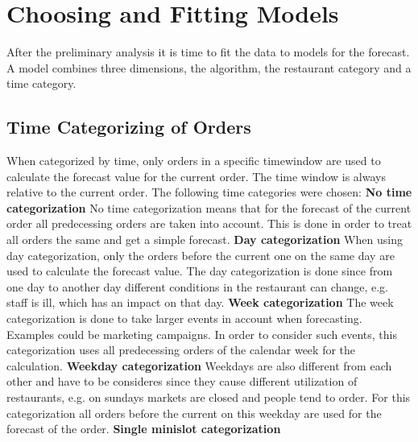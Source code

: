 \section{Choosing and Fitting Models}\label{Choosing and Fitting Models}
After the preliminary analysis it is time to fit the data to models for the forecast. A model combines three dimensions, the algorithm, the restaurant category and a time category.
\subsection{Time Categorizing of Orders}\label{subsection:Categorizing by Order}
When categorized by time, only orders in a specific timewindow are used to calculate the forecast value for the current order. The time window is always relative to the current order. The following time categories were chosen:\newline
\newline\textbf{No time categorization}\newline
No time categorization means that for the forecast of the current order all predecessing orders are taken into account. This is done in order to treat all orders the same and get a simple forecast.
\newline\textbf{Day categorization}\newline
When using day categorization, only the orders before the current one on the same day are used to calculate the forecast value. The day categorization is done since from one day to another day different conditions in the restaurant can change, e.g. staff is ill, which has an impact on that day.
\newline\textbf{Week categorization}\newline
The week categorization is done to take larger events in account when forecasting. Examples could be marketing campaigns. In order to consider such events, this categorization uses all predecessing orders of the calendar week for the calculation.
\newline\textbf{Weekday categorization}\newline
Weekdays are also different from each other and have to be consideres since they cause different utilization of restaurants, e.g. on sundays markets are closed and people tend to order. For this categorization all orders before the current on this weekday are used for the forecast of the order.
\newline\textbf{Single minislot categorization}\newline
